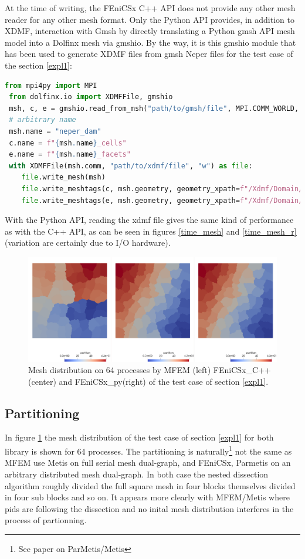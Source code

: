 \documentclass[12pt]{article}
\newcommand{\f}[1]{FEniCSx#1}
\begin{document}
 At the time of writing, the \f{} C++ API does not provide any other mesh reader for any other mesh format.
 Only the Python API provides, in addition to XDMF,  interaction with Gmsh by directly translating a Python gmsh API mesh model into a Dolfinx mesh via gmshio.
 By the way, it is this gmshio module that has been used to generate XDMF files from gmsh Neper files for the test case of the section \ref{expl1}:

 \begin{lstlisting}[numbers=none,basicstyle=\footnotesize,language=Python]
 from mpi4py import MPI
 from dolfinx.io import XDMFFile, gmshio
 msh, c, e = gmshio.read_from_msh("path/to/gmsh/file", MPI.COMM_WORLD, gdim=2)
 # arbitrary name
 msh.name = "neper_dam" 
 c.name = f"{msh.name}_cells"
 e.name = f"{msh.name}_facets"
 with XDMFFile(msh.comm, "path/to/xdmf/file", "w") as file:
 	file.write_mesh(msh)
 	file.write_meshtags(c, msh.geometry, geometry_xpath=f"/Xdmf/Domain/Grid[@Name='{msh.name}']/Geometry")
 	file.write_meshtags(e, msh.geometry, geometry_xpath=f"/Xdmf/Domain/Grid[@Name='{msh.name}']/Geometry")
\end{lstlisting}
 
 
 With the Python API, reading the xdmf file gives the same kind of performance as with the C++ API, as can be seen in figures \ref{time_mesh} and \ref{time_mesh_r} (variation are certainly due to I/O hardware).
 
 
 \begin{figure}
 	\includegraphics[width=1.\textwidth]{part.png}
 	\caption{Mesh distribution on 64 processes by MFEM (left) \f{\_C++}(center) and \f{\_py}(right) of the test case of section \ref{expl1}.\label{Partition}}
 \end{figure}
  
\subsection{Partitioning\label{partitioning}} 
 In figure \ref{Partition} the mesh distribution of the test case of section \ref{expl1} for both library is shown for 64 processes. 
 The partitioning is naturally\footnote{See paper on ParMetis/Metis} not the same as MFEM use Metis on full serial mesh dual-graph, and \f{}, Parmetis on an arbitrary distributed mesh dual-graph. In both case the nested dissection algorithm  roughly divided the full square mesh in four blocks themselves divided in four sub blocks and so on. It appears more clearly with MFEM/Metis where pids are following the dissection and no inital mesh distribution interferes in the process of partionning.
 
\end{document}
